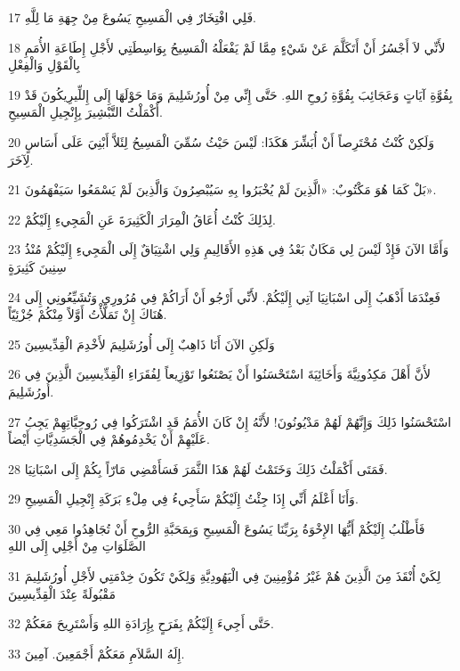 \par 17 فَلِي افْتِخَارٌ فِي الْمَسِيحِ يَسُوعَ مِنْ جِهَةِ مَا لِلَّهِ.
\par 18 لأَنِّي لاَ أَجْسُرُ أَنْ أَتَكَلَّمَ عَنْ شَيْءٍ مِمَّا لَمْ يَفْعَلْهُ الْمَسِيحُ بِوَاسِطَتِي لأَجْلِ إِطَاعَةِ الأُمَمِ بِالْقَوْلِ وَالْفِعْلِ
\par 19 بِقُوَّةِ آيَاتٍ وَعَجَائِبَ بِقُوَّةِ رُوحِ اللهِ. حَتَّى إِنِّي مِنْ أُورُشَلِيمَ وَمَا حَوْلَهَا إِلَى إِللِّيرِيكُونَ قَدْ أَكْمَلْتُ التَّبْشِيرَ بِإِنْجِيلِ الْمَسِيحِ.
\par 20 وَلَكِنْ كُنْتُ مُحْتَرِصاً أَنْ أُبَشِّرَ هَكَذَا: لَيْسَ حَيْثُ سُمِّيَ الْمَسِيحُ لِئَلاَّ أَبْنِيَ عَلَى أَسَاسٍ لِآخَرَ.
\par 21 بَلْ كَمَا هُوَ مَكْتُوبٌ: «الَّذِينَ لَمْ يُخْبَرُوا بِهِ سَيُبْصِرُونَ وَالَّذِينَ لَمْ يَسْمَعُوا سَيَفْهَمُونَ».
\par 22 لِذَلِكَ كُنْتُ أُعَاقُ الْمِرَارَ الْكَثِيرَةَ عَنِ الْمَجِيءِ إِلَيْكُمْ.
\par 23 وَأَمَّا الآنَ فَإِذْ لَيْسَ لِي مَكَانٌ بَعْدُ فِي هَذِهِ الأَقَالِيمِ وَلِي اشْتِيَاقٌ إِلَى الْمَجِيءِ إِلَيْكُمْ مُنْذُ سِنِينَ كَثِيرَةٍ
\par 24 فَعِنْدَمَا أَذْهَبُ إِلَى اسْبَانِيَا آتِي إِلَيْكُمْ. لأَنِّي أَرْجُو أَنْ أَرَاكُمْ فِي مُرُورِي وَتُشَيِّعُونِي إِلَى هُنَاكَ إِنْ تَمَلَّأْتُ أَوَّلاً مِنْكُمْ جُزْئِيّاً.
\par 25 وَلَكِنِ الآنَ أَنَا ذَاهِبٌ إِلَى أُورُشَلِيمَ لأَخْدِمَ الْقِدِّيسِينَ
\par 26 لأَنَّ أَهْلَ مَكِدُونِيَّةَ وَأَخَائِيَةَ اسْتَحْسَنُوا أَنْ يَصْنَعُوا تَوْزِيعاً لِفُقَرَاءِ الْقِدِّيسِينَ الَّذِينَ فِي أُورُشَلِيمَ.
\par 27 اسْتَحْسَنُوا ذَلِكَ وَإِنَّهُمْ لَهُمْ مَدْيُونُونَ! لأَنَّهُ إِنْ كَانَ الأُمَمُ قَدِ اشْتَرَكُوا فِي رُوحِيَّاتِهِمْ يَجِبُ عَلَيْهِمْ أَنْ يَخْدِمُوهُمْ فِي الْجَسَدِيَّاتِ أَيْضاً.
\par 28 فَمَتَى أَكْمَلْتُ ذَلِكَ وَخَتَمْتُ لَهُمْ هَذَا الثَّمَرَ فَسَأَمْضِي مَارّاً بِكُمْ إِلَى اسْبَانِيَا.
\par 29 وَأَنَا أَعْلَمُ أَنِّي إِذَا جِئْتُ إِلَيْكُمْ سَأَجِيءُ فِي مِلْءِ بَرَكَةِ إِنْجِيلِ الْمَسِيحِ.
\par 30 فَأَطْلُبُ إِلَيْكُمْ أَيُّهَا الإِخْوَةُ بِرَبِّنَا يَسُوعَ الْمَسِيحِ وَبِمَحَبَّةِ الرُّوحِ أَنْ تُجَاهِدُوا مَعِي فِي الصَّلَوَاتِ مِنْ أَجْلِي إِلَى اللهِ
\par 31 لِكَيْ أُنْقَذَ مِنَ الَّذِينَ هُمْ غَيْرُ مُؤْمِنِينَ فِي الْيَهُودِيَّةِ وَلِكَيْ تَكُونَ خِدْمَتِي لأَجْلِ أُورُشَلِيمَ مَقْبُولَةً عِنْدَ الْقِدِّيسِينَ
\par 32 حَتَّى أَجِيءَ إِلَيْكُمْ بِفَرَحٍ بِإِرَادَةِ اللهِ وَأَسْتَرِيحَ مَعَكُمْ.
\par 33 إِلَهُ السَّلاَمِ مَعَكُمْ أَجْمَعِينَ. آمِينَ.

